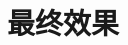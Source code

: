 \documentclass[12pt, a4paper, oneside]{ctexbook}
\begin{document}
	
		

		\chapter{最终效果}
		


	
	
\end{document}
